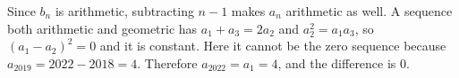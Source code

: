 Since $b_n$ is arithmetic, subtracting $n-1$ makes $a_n$ arithmetic as well. A sequence both arithmetic and geometric has $a_1+a_3=2a_2$ and $a_2^2=a_1a_3$, so $(a_1-a_2)^2=0$ and it is constant. Here it cannot be the zero sequence because $a_{2019}=2022-2018=4$. Therefore $a_{2022}=a_1=4$, and the difference is $\boxed0$.
